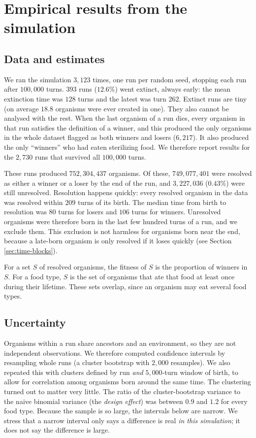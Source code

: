 \documentclass{article}
\begin{document}
\section{Empirical results from the simulation}
\label{empiricalsecn}

\subsection{Data and estimates}

We ran the simulation $3{,}123$ times, one run per random seed, stopping each
run after $100{,}000$ turns. $393$ runs ($12.6\%$) went extinct, always early:
the mean extinction time was $128$ turns and the latest was turn $262$.
Extinct runs are tiny (on average $18.8$ organisms were ever created in one).
They also cannot be analysed with the rest. When the last organism of a run
dies, every organism in that run satisfies the definition of a winner, and
this produced the only organisms in the whole dataset flagged as both winners
and losers ($6{,}217$). It also produced the only ``winners'' who had eaten
sterilizing food. We therefore report results for the $2{,}730$ runs that
survived all $100{,}000$ turns.

These runs produced $752{,}304{,}437$ organisms. Of these, $749{,}077{,}401$
were resolved as either a winner or a loser by the end of the run, and
$3{,}227{,}036$ ($0.43\%$) were still unresolved. Resolution happens quickly:
every resolved organism in the data was resolved within $209$ turns of its
birth. The median time from birth to resolution was $80$ turns for losers
and $106$ turns for winners. Unresolved organisms were therefore born in the
last few hundred turns of a run, and we exclude them. This exclusion is not
harmless for organisms born near the end, because a late-born organism is only
resolved if it loses quickly (see Section \ref{sec:time-blocks}).

For a set $S$ of resolved organisms, the fitness of $S$ is the proportion of
winners in $S$. For a food type, $S$ is the set of organisms that ate that food
at least once during their lifetime. These sets overlap, since an organism may
eat several food types.

\subsection{Uncertainty}

Organisms within a run share ancestors and an environment, so they are not
independent observations. We therefore computed confidence intervals by
resampling whole runs (a cluster bootstrap with $2{,}000$ resamples). We also
repeated this with clusters defined by run \emph{and} $5{,}000$-turn window of
birth,
to allow for correlation among
organisms born around the same time. The clustering turned out to matter very
little. The ratio of the cluster-bootstrap variance to the naive binomial
variance (the \emph{design effect}) was between $0.9$ and $1.2$ for every
food type. Because the sample is so large, the intervals below are narrow. We
stress that a narrow interval only says a difference is real \emph{in this
simulation}; it does not say the difference is large.
\end{document}
